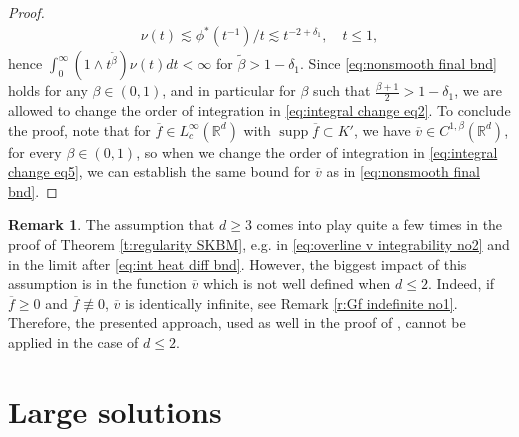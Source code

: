 \documentclass[12pt,a4paper,onecolumn]{amsart}
\DeclareMathOperator\supp{supp}
\theoremstyle{definition}
\newtheorem{rem}[thm]{Remark}
\newcommand{\R}{\mathbb{R}}
\newcommand{\1}{\mathbf 1}
\newcommand{\wt}{\widetilde}
\numberwithin{equation}{section}
\begin{document}
\begin{proof}
\begin{align*}
    \nu(t)\lesssim \phi^*(t^{-1})/t\lesssim t^{-2+\delta_1},\quad t\le 1,
\end{align*}
 hence $\int_0^\infty(1\wedge t^{\wt\beta})\nu(t)dt<\infty$ for $\wt\beta > 1-\delta_1$. Since \eqref{eq:nonsmooth final bnd} holds for any $\beta\in (0,1)$, and in particular for $\beta$ such that $\frac{\beta+1}{2}>1-\delta_1$, we are allowed to change the order of integration in \eqref{eq:integral change eq2}. To conclude the proof, note that for $\overline f\in L_c^\infty(\R^d)$ with $\supp \overline f\subset{K'}$, we have $\overline v\in C^{1,\beta}(\R^d)$, for every $\beta\in (0,1)$, so when we change the order of integration in \eqref{eq:integral change eq5}, we can establish the same bound for $\overline v$ as in \eqref{eq:nonsmooth final bnd}.
\end{proof}


\begin{rem}\label{r:Gf indefinite no2}
    The assumption that $d\ge 3$ comes into play quite a few times in the proof of Theorem \ref{t:regularity SKBM}, e.g. in \eqref{eq:overline v integrability no2} and in the limit after \eqref{eq:int heat diff bnd}. However, the biggest impact of this assumption is in the function $\overline v$ which is not well defined when $d\le2$. Indeed, if $\overline f\ge0$ and $\overline f \not\equiv 0$, $\overline v$ is identically infinite, see Remark \ref{r:Gf indefinite no1}. Therefore, the presented approach, used as well in the proof of \cite[Lemma 21]{AbaDupaNonhomo2017}, cannot be applied in the case of $d\le 2$.
\end{rem}

\section{Large solutions}\label{s:large}
\end{document}
